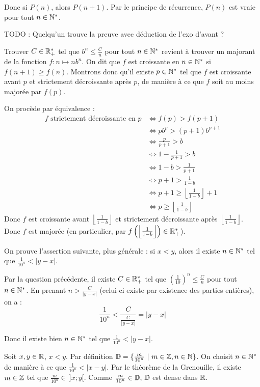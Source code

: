 \documentclass[]{../templates/homework}
\providecommand{\floor}[1]{\left \lfloor #1 \right \rfloor }
\begin{document}
Donc si $P(n)$, alors $P(n+1)$. Par le principe de récurrence, $P(n)$ est vraie pour tout $n\in\mathbb N^*$.

\question TODO : Quelqu'un trouve la preuve avec déduction de l'exo d'avant ?

Trouver $C\in\mathbb R_+^*$ tel que $b^n \leq \frac C n$ pour tout $n\in\mathbb N^*$ revient à trouver un majorant de la fonction $f : n\mapsto nb^n$. On dit que $f$ est croissante en $n \in \mathbb N^*$ si $f(n+1) \geq f(n)$. Montrons donc qu'il existe $p\in\mathbb N^*$ tel que $f$ est croissante avant $p$ et strictement décroissante après $p$, de manière à ce que $f$ soit au moins majorée par $f(p)$.

On procède par équivalence :
\begin{align*}
	f \text{ strictement décroissante en } p & \iff f(p) > f(p+1) \\
		& \iff pb^p > (p+1)b^{p+1} \\
		& \iff \frac p {p+1} > b \\
		& \iff 1 - \frac 1 {p+1} > b \\
		& \iff 1 - b > \frac 1 {p+1} \\
		& \iff p +1 > \frac 1 {1-b} \\
		& \iff p + 1 \geq \floor {\frac 1 {1-b}} + 1 \\
		& \iff p \geq \floor {\frac 1 {1-b}}
\end{align*}
Donc $f$ est croissante avant $\floor {\frac 1 {1-b}}$ et strictement décroissante après $\floor {\frac 1 {1-b}}$. Donc $f$ est majorée (en particulier, par $f\left(\floor {\frac 1 {1-b}}\right ) \in \R_+^*$).

\subproblem
\question On prouve l'assertion suivante, plus générale : si $x < y$, alors il existe $n\in\mathbb N^*$ tel que $\frac 1 {10^n} < |y-x|$. 

Par la question précédente, il existe $C\in\mathbb R_+^*$ tel que $\left(\frac 1 {10}\right)^n \leq \frac C n$ pour tout $n\in\mathbb N^*$. En prenant $n > \frac C {|y-x|}$ (celui-ci existe par existence des parties entières), on a : $$\frac 1 {10^n} < \frac C {\frac C {|y-x|}} = |y-x|$$

Donc il existe bien $n \in \mathbb N^*$ tel que $\frac 1 {10^n} < |y-x|$.

\question Soit $x,y\in\mathbb R$, $x<y$. Par définition $\D = \{\frac m {10^n}\ |\ m\in\Z, n\in\N\}$. On choisit $n\in\mathbb N^*$ de manière à ce que $\frac 1 {10^n} < |x-y|$. Par le théorème de la Grenouille, il existe $m\in\mathbb Z$ tel que $\frac m {10^n} \in\ ]x;y[$. Comme $\frac m {10^n} \in \mathbb D$, $\mathbb D$ est dense dans $\mathbb R$.
\end{document}
